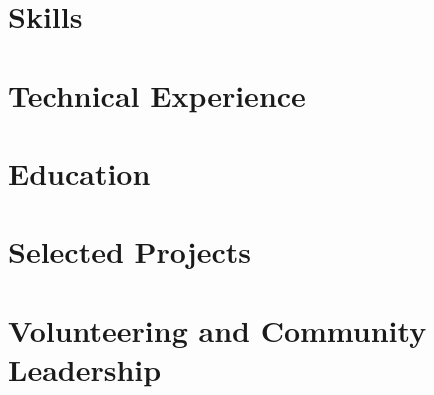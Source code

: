 \documentclass[letter,10pt]{article}
\begin{document}


\section{Skills}


\section{Technical Experience}


\section{Education}



\section{Selected Projects}


\section{Volunteering and Community Leadership}

\end{document}
